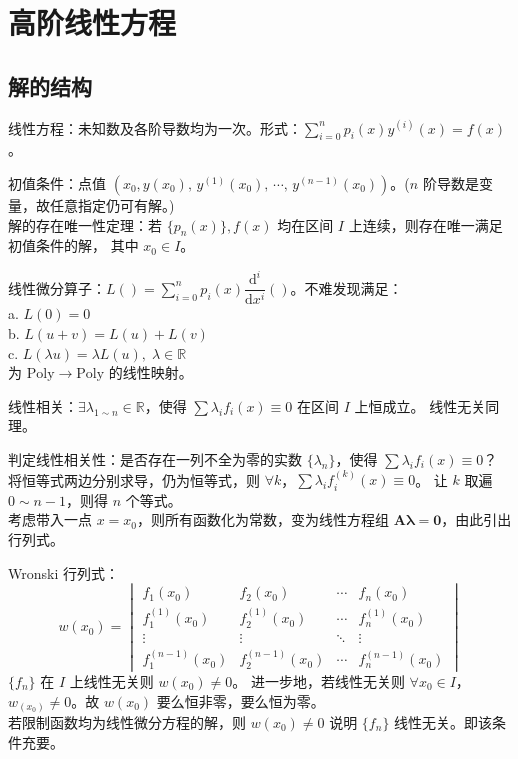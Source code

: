 \documentclass[12pt, a4paper, UTF8, openany]{ctexbook}
\newcommand{\dif}{\mathrm{d}}
\newcommand{\field}[1]{\mathbb{#1}}%
\newcommand{\poly}{\mathrm{Poly}}
\newcommand{\mat}[1]{\mathbf{#1}}
\begin{document}
    \section{高阶线性方程}
        \subsection{解的结构}
        线性方程：未知数及各阶导数均为一次。形式：$\sum\limits_{i = 0}^{n} p_i(x) y^{(i)}(x) = f(x)$。

        初值条件：点值 $(x_0, y(x_0),\, y^{(1)}(x_0),\, \cdots,\, y^{(n - 1)}(x_0))$。($n$ 阶导数是变量，故任意指定仍可有解。)\\
        {\heiti 解的存在唯一性定理}：若 $\{p_n(x)\}, f(x)$ 均在区间 $I$ 上连续，则存在{\heiti 唯一}满足初值条件的解，
        其中 $x_0 \in I$。

        线性微分算子：$L() = \sum\limits_{i = 0}^{n} p_i(x) \dfrac{\dif^i}{\dif x^i} ()$。不难发现满足：\\
        a. $L(0) = 0$\\
        b. $L(u + v) = L(u) + L(v)$\\
        c. $L(\lambda u) = \lambda L(u), \; \lambda \in \field{R}$\\
        为 $\poly \to \poly$ 的线性映射。

        线性相关：$\exists \lambda_{1 \sim n} \in \field{R}$，使得 $\sum \lambda_i f_i(x) \equiv 0$ 在区间 $I$ 上恒成立。
        线性无关同理。

        判定线性相关性：是否存在一列不全为零的实数 $\{\lambda_n\}$，使得 $\sum\lambda_i f_i(x) \equiv 0$？\\
        将恒等式两边分别求导，仍为恒等式，则 $\forall k$，$\sum\lambda_i f_i^{(k)}(x) \equiv 0$。
        让 $k$ 取遍 $0 \sim n - 1$，则得 $n$ 个等式。\\
        考虑带入一点 $x = x_0$，则所有函数化为常数，变为线性方程组 $\mat{A\lambda} = \mat{0}$，由此引出行列式。

        Wronski 行列式：
        $$w(x_0) = 
        \begin{vmatrix}
            f_1(x_0) & f_2(x_0) & \cdots & f_n(x_0) \\
            f_1^{(1)}(x_0) & f_2^{(1)}(x_0) & \cdots & f_n^{(1)}(x_0) \\
            \vdots & \vdots & \ddots & \vdots \\
            f_1^{(n - 1)}(x_0) & f_2^{(n - 1)}(x_0) & \cdots & f_n^{(n - 1)}(x_0)
        \end{vmatrix}$$
        $\{f_n\}$ 在 $I$ 上线性无关则 $w(x_0) \neq 0$。
        进一步地，若线性无关则 $\forall x_0 \in I$，$w_(x_0) \neq 0$。故 $w(x_0)$ 要么恒非零，要么恒为零。\\
        若{\heiti 限制}函数均为{\heiti 线性微分方程的解}，则 $w(x_0) \neq 0$ 说明 $\{f_n\}$ 线性无关。即该条件{\heiti 充要}。
\end{document}
